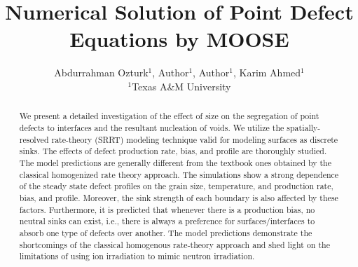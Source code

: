 \documentclass[a4paper]{article}
\title{Numerical Solution of Point Defect Equations by MOOSE}
\author{Abdurrahman Ozturk$^{1}$, Author$^{1}$, Author$^{1}$, Karim Ahmed$^{1}$  \\
        \small $^{1}$Texas A\&M University \\
}
\begin{document}
\maketitle

\begin{abstract}

We present a detailed investigation of the effect of size on the segregation of point defects to interfaces and the resultant nucleation of voids. We utilize the spatially-resolved rate-theory (SRRT) modeling technique valid for modeling surfaces as discrete sinks. The effects of defect production rate, bias, and profile are thoroughly studied. The model predictions are generally different from the textbook ones obtained by the classical homogenized rate theory approach. The simulations show a strong dependence of the steady state defect profiles on the grain size, temperature, and production rate, bias, and profile. Moreover, the sink strength of each boundary is also affected by these factors. Furthermore, it is predicted that whenever there is a production bias, no neutral sinks can exist, i.e., there is always a preference for surfaces/interfaces to absorb one type of defects over another. The model predictions demonstrate the shortcomings of the classical homogenous rate-theory approach and shed light on the limitations of using ion irradiation to mimic neutron irradiation.


\end{abstract} \hspace{10pt}
\end{document}

